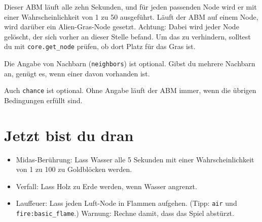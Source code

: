 Dieser ABM läuft alle zehn Sekunden, und für jeden passenden Node wird
er mit einer Wahrscheinlichkeit von 1 zu 50 ausgeführt. Läuft der ABM
auf einem Node, wird darüber ein Alien-Gras-Node gesetzt. Achtung: Dabei
wird jeder Node gelöscht, der sich vorher an dieser Stelle befand. Um
das zu verhindern, solltest du mit
\texttt{core.\allowbreak{}get\_\allowbreak{}node}
prüfen, ob dort Platz für das Gras ist.

Die Angabe von Nachbarn (\texttt{neighbors}) ist optional. Gibst du
mehrere Nachbarn an, genügt es, wenn einer davon vorhanden ist.

Auch \texttt{chance} ist optional. Ohne Angabe läuft der ABM immer, wenn
die übrigen Bedingungen erfüllt sind.

\section{Jetzt bist du dran}\label{jetzt-bist-du-dran}

\begin{itemize}
\tightlist
\item
  Midas-Berührung: Lass Wasser alle 5 Sekunden mit einer
  Wahrscheinlichkeit von 1 zu 100 zu Goldblöcken werden.
\item
  Verfall: Lass Holz zu Erde werden, wenn Wasser angrenzt.
\item
  Lauffeuer: Lass jeden Luft-Node in Flammen aufgehen. (Tipp:
  \texttt{\textquotedbl{}air\textquotedbl{}} und
  \texttt{\textquotedbl{}fire:basic\_\allowbreak{}flame\textquotedbl{}}.)
  Warnung: Rechne damit, dass das Spiel abstürzt.
\end{itemize}
